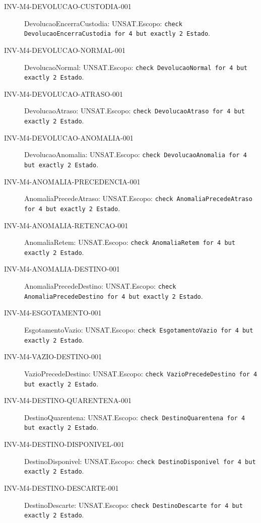 \begin{description}
\item[INV-M4-DEVOLUCAO-CUSTODIA-001] DevolucaoEncerraCustodia: UNSAT.\newline Escopo: \texttt{check DevolucaoEncerraCustodia for 4 but exactly 2 Estado}.
\item[INV-M4-DEVOLUCAO-NORMAL-001] DevolucaoNormal: UNSAT.\newline Escopo: \texttt{check DevolucaoNormal for 4 but exactly 2 Estado}.
\item[INV-M4-DEVOLUCAO-ATRASO-001] DevolucaoAtraso: UNSAT.\newline Escopo: \texttt{check DevolucaoAtraso for 4 but exactly 2 Estado}.
\item[INV-M4-DEVOLUCAO-ANOMALIA-001] DevolucaoAnomalia: UNSAT.\newline Escopo: \texttt{check DevolucaoAnomalia for 4 but exactly 2 Estado}.
\item[INV-M4-ANOMALIA-PRECEDENCIA-001] AnomaliaPrecedeAtraso: UNSAT.\newline Escopo: \texttt{check AnomaliaPrecedeAtraso for 4 but exactly 2 Estado}.
\item[INV-M4-ANOMALIA-RETENCAO-001] AnomaliaRetem: UNSAT.\newline Escopo: \texttt{check AnomaliaRetem for 4 but exactly 2 Estado}.
\item[INV-M4-ANOMALIA-DESTINO-001] AnomaliaPrecedeDestino: UNSAT.\newline Escopo: \texttt{check AnomaliaPrecedeDestino for 4 but exactly 2 Estado}.
\item[INV-M4-ESGOTAMENTO-001] EsgotamentoVazio: UNSAT.\newline Escopo: \texttt{check EsgotamentoVazio for 4 but exactly 2 Estado}.
\item[INV-M4-VAZIO-DESTINO-001] VazioPrecedeDestino: UNSAT.\newline Escopo: \texttt{check VazioPrecedeDestino for 4 but exactly 2 Estado}.
\item[INV-M4-DESTINO-QUARENTENA-001] DestinoQuarentena: UNSAT.\newline Escopo: \texttt{check DestinoQuarentena for 4 but exactly 2 Estado}.
\item[INV-M4-DESTINO-DISPONIVEL-001] DestinoDisponivel: UNSAT.\newline Escopo: \texttt{check DestinoDisponivel for 4 but exactly 2 Estado}.
\item[INV-M4-DESTINO-DESCARTE-001] DestinoDescarte: UNSAT.\newline Escopo: \texttt{check DestinoDescarte for 4 but exactly 2 Estado}.

\end{description}
